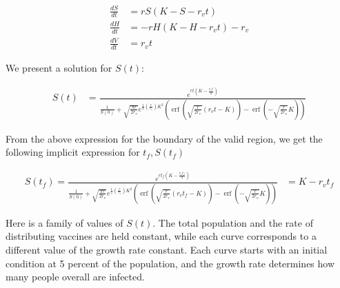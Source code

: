 \documentclass{article}
\DeclareMathOperator\erf{erf}
\begin{document}
\begin{align*}
\frac{dS}{dt} & = r S \left( K - S - r_v t \right)\\
\frac{dH}{dt} & = - r H \left( K - H - r_v t \right) - r_v \\
\frac{dV}{dt} & = r_v t
\end{align*}

We present a solution for $S(t)$:

\begin{align}
S(t) & = 
	\frac{e^{ r t (K - \frac{ r_v t}{2})}}
	{\frac{1}{S(0)} + \sqrt{\frac{\pi r}{2 r_v}}
		e^{\frac12 \left( \frac{r}{r_v} \right) K^2}
		\left(\erf\left(  \sqrt{\frac{r}{2 r_v}} (r_v t - K ) \right)
			- \erf\left( - \sqrt{\frac{r}{2 r_v}} K \right) \right)}
\end{align}

From the above expression for the boundary of the valid region,
	we get the following implicit expression for $t_f, S(t_f)$

\begin{align}
S(t_f) = 
	\frac{e^{ r t_f (K - \frac{ r_v t_f }{2})}}
	{\frac{1}{S(0)} + \sqrt{\frac{\pi r}{2 r_v}}
		e^{\frac12 \left( \frac{r}{r_v} \right) K^2}
		\left(\erf\left(  \sqrt{\frac{r}{2 r_v}} (r_v t_f - K ) \right)
			- \erf\left( - \sqrt{\frac{r}{2 r_v}} K \right) \right)}
	& = K - r_v t_f 
\end{align}

Here is a family of values of $S(t)$.
The total population and the rate of distributing vaccines are
	held constant, while each curve corresponds to a different
	value of the growth rate constant.
Each curve starts with an initial condition at 5 percent of the
	population, and the growth rate determines how many people
	overall are infected.

\paragraph{}
\mydata
{}
\paragraph{}
\end{document}
